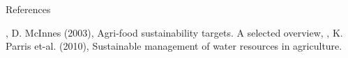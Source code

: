 \documentclass[t,9pt,aspectratio=169]{beamer}
\begin{document}
\begin{frame}
{References}
\begin{footnotesize}
\begin{thebibliography}{1}
, D. McInnes (2003), Agri-food sustainability targets. A selected overview, 
,
K. Parris et-al. (2010), Sustainable management of water resources in agriculture. 
\end{thebibliography}
\end{footnotesize}
\vspace{0.5cm}


\end{frame}
\end{document}
